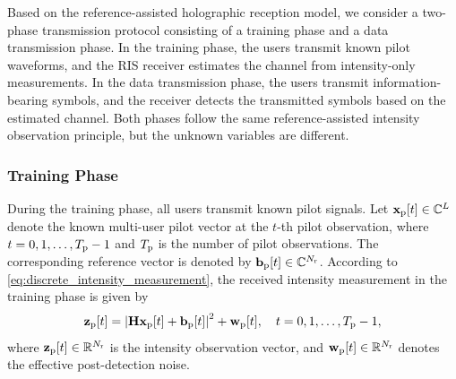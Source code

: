 \documentclass[journal]{IEEEtran}
\begin{document}
Based on the reference-assisted holographic reception model, we consider a two-phase transmission protocol consisting of a training phase and a data transmission phase. 
In the training phase, the users transmit known pilot waveforms, and the RIS receiver estimates the channel from intensity-only measurements. 
In the data transmission phase, the users transmit information-bearing symbols, and the receiver detects the transmitted symbols based on the estimated channel. 
Both phases follow the same reference-assisted intensity observation principle, but the unknown variables are different.

\subsubsection{Training Phase}

During the training phase, all users transmit known pilot signals. 
Let $\mathbf{x}_{\rm p}[t]\in\mathbb{C}^{L}$ denote the known multi-user pilot vector at the $t$-th pilot observation, where $t=0,1,\ldots,T_{\rm p}-1$ and $T_{\rm p}$ is the number of pilot observations. 
The corresponding reference vector is denoted by $\mathbf{b}_{\rm p}[t]\in\mathbb{C}^{N_{\rm r}}$. 
According to \eqref{eq:discrete_intensity_measurement}, the received intensity measurement in the training phase is given by
\begin{equation}
\mathbf{z}_{\rm p}[t]
=
\left|
\mathbf{H}\mathbf{x}_{\rm p}[t]
+
\mathbf{b}_{\rm p}[t]
\right|^2
+
\mathbf{w}_{\rm p}[t],
\quad
t=0,1,\ldots,T_{\rm p}-1,
\label{eq:pilot_phase_measurement}
\end{equation}
where $\mathbf{z}_{\rm p}[t]\in\mathbb{R}^{N_{\rm r}}$ is the intensity observation vector, and $\mathbf{w}_{\rm p}[t]\in\mathbb{R}^{N_{\rm r}}$ denotes the effective post-detection noise.
\end{document}
